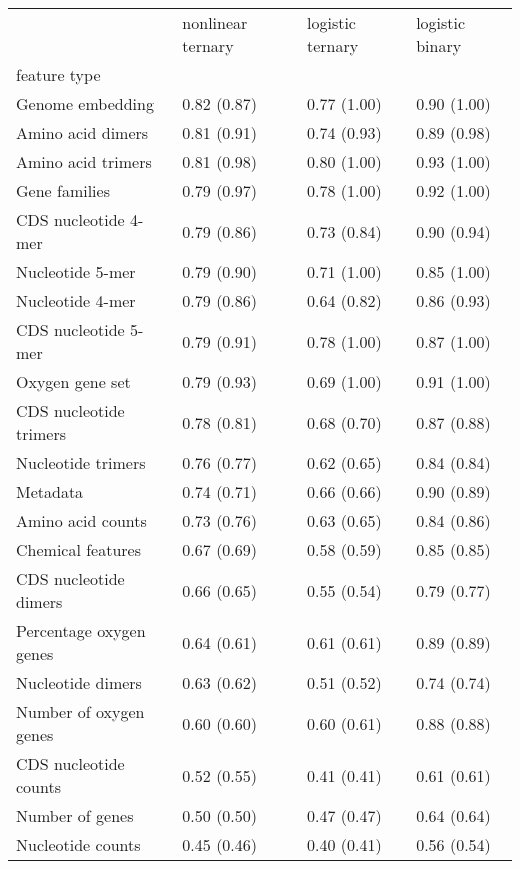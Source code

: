 \begin{tabular}{llll}
\toprule
 & nonlinear ternary & logistic ternary & logistic binary \\
feature type &  &  &  \\
\midrule
Genome embedding & 0.82 (0.87) & 0.77 (1.00) & 0.90 (1.00) \\
Amino acid dimers & 0.81 (0.91) & 0.74 (0.93) & 0.89 (0.98) \\
Amino acid trimers & 0.81 (0.98) & 0.80 (1.00) & 0.93 (1.00) \\
Gene families & 0.79 (0.97) & 0.78 (1.00) & 0.92 (1.00) \\
CDS nucleotide 4-mer & 0.79 (0.86) & 0.73 (0.84) & 0.90 (0.94) \\
Nucleotide 5-mer & 0.79 (0.90) & 0.71 (1.00) & 0.85 (1.00) \\
Nucleotide 4-mer & 0.79 (0.86) & 0.64 (0.82) & 0.86 (0.93) \\
CDS nucleotide 5-mer & 0.79 (0.91) & 0.78 (1.00) & 0.87 (1.00) \\
Oxygen gene set & 0.79 (0.93) & 0.69 (1.00) & 0.91 (1.00) \\
CDS nucleotide trimers & 0.78 (0.81) & 0.68 (0.70) & 0.87 (0.88) \\
Nucleotide trimers & 0.76 (0.77) & 0.62 (0.65) & 0.84 (0.84) \\
Metadata & 0.74 (0.71) & 0.66 (0.66) & 0.90 (0.89) \\
Amino acid counts & 0.73 (0.76) & 0.63 (0.65) & 0.84 (0.86) \\
Chemical features & 0.67 (0.69) & 0.58 (0.59) & 0.85 (0.85) \\
CDS nucleotide dimers & 0.66 (0.65) & 0.55 (0.54) & 0.79 (0.77) \\
Percentage oxygen genes & 0.64 (0.61) & 0.61 (0.61) & 0.89 (0.89) \\
Nucleotide dimers & 0.63 (0.62) & 0.51 (0.52) & 0.74 (0.74) \\
Number of oxygen genes & 0.60 (0.60) & 0.60 (0.61) & 0.88 (0.88) \\
CDS nucleotide counts & 0.52 (0.55) & 0.41 (0.41) & 0.61 (0.61) \\
Number of genes & 0.50 (0.50) & 0.47 (0.47) & 0.64 (0.64) \\
Nucleotide counts & 0.45 (0.46) & 0.40 (0.41) & 0.56 (0.54) \\
\bottomrule
\end{tabular}
